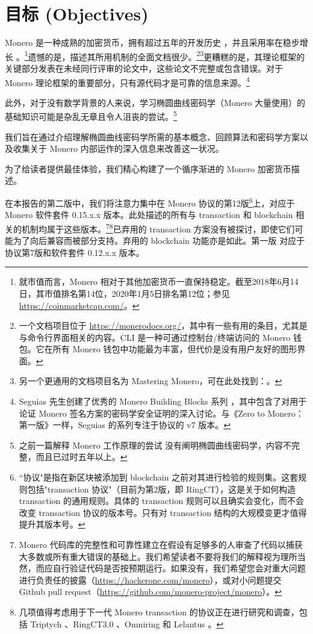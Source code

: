 \section{目标 (Objectives)}
\label{sec:goals}

Monero 是一种成熟的加密货币，拥有超过五年的开发历史 \cite{bitmonero-launched, monero-history}，并且采用率在稳步增长 \cite{justin-defcon-2019-community-growth}。\footnote{\label{marketcap_note}就市值而言，Monero 相对于其他加密货币一直保持稳定。截至2018年6月14日，其市值排名第14位，2020年1月5日排名第12位；参见 \url{https://coinmarketcap.com/}。}遗憾的是，描述其所用机制的全面文档很少。\footnote{一个文档项目位于 \url{https://monerodocs.org/}，其中有一些有用的条目，尤其是与命令行界面相关的内容。CLI 是一种可通过控制台/终端访问的 Monero 钱包。它在所有 Monero 钱包中功能最为丰富，但代价是没有用户友好的图形界面。}\footnote{另一个更通用的文档项目名为 Mastering Monero，可在此处找到：\cite{mastering-monero}。}更糟糕的是，其理论框架的关键部分发表在未经同行评审的论文中，这些论文不完整或包含错误。对于 Monero 理论框架的重要部分，只有源代码才是可靠的信息来源。\footnote{Seguias 先生创建了优秀的 Monero Building Blocks 系列 \cite{monero-building-blocks}，其中包含了对用于论证 Monero 签名方案的密码学安全证明的深入讨论。与《Zero to Monero：第一版》\cite{ztm-1}一样，Seguias 的系列专注于协议的 v7 版本。}

此外，对于没有数学背景的人来说，学习椭圆曲线密码学（Monero 大量使用）的基础知识可能是杂乱无章且令人沮丧的尝试。\footnote{之前一篇解释 Monero 工作原理的尝试 \cite{MRL-0003-about-monero} 没有阐明椭圆曲线密码学，内容不完整，而且已过时五年以上。}

我们旨在通过介绍理解椭圆曲线密码学所需的基本概念、回顾算法和密码学方案以及收集关于 Monero 内部运作的深入信息来改善这一状况。

为了给读者提供最佳体验，我们精心构建了一个循序渐进的 Monero 加密货币描述。

在本报告的第二版中，我们将注意力集中在 Monero 协议的第12版\footnote{``协议"是指在新区块被添加到 blockchain 之前对其进行检验的规则集。这套规则包括"transaction 协议"（目前为第2版，即 RingCT），这是关于如何构造 transaction 的通用规则。具体的 transaction 规则可以且确实会变化，而不会改变 transaction 协议的版本号。只有对 transaction 结构的大规模变更才值得提升其版本号。}上，对应于 Monero 软件套件 0.15.x.x 版本。此处描述的所有与 transaction 和 blockchain 相关的机制均属于这些版本。\footnote{Monero 代码库的完整性和可靠性建立在假设有足够多的人审查了代码以捕获大多数或所有重大错误的基础上。我们希望读者不要将我们的解释视为理所当然，而应自行验证代码是否按预期运行。如果没有，我们希望您会对重大问题进行负责任的披露（\url{https://hackerone.com/monero}），或对小问题提交 Github pull request（\url{https://github.com/monero-project/monero}）。}\footnote{几项值得考虑用于下一代 Monero transaction 的协议正在进行研究和调查，包括 Triptych \cite{triptych-preprint}、RingCT3.0 \cite{ringct3-preprint}、Omniring \cite{omniring-paper} 和 Lelantus \cite{lelantus-preprint}。}已弃用的 transaction 方案没有被探讨，即使它们可能为了向后兼容而被部分支持。弃用的 blockchain 功能亦是如此。第一版 \cite{ztm-1} 对应于协议第7版和软件套件 0.12.x.x 版本。



